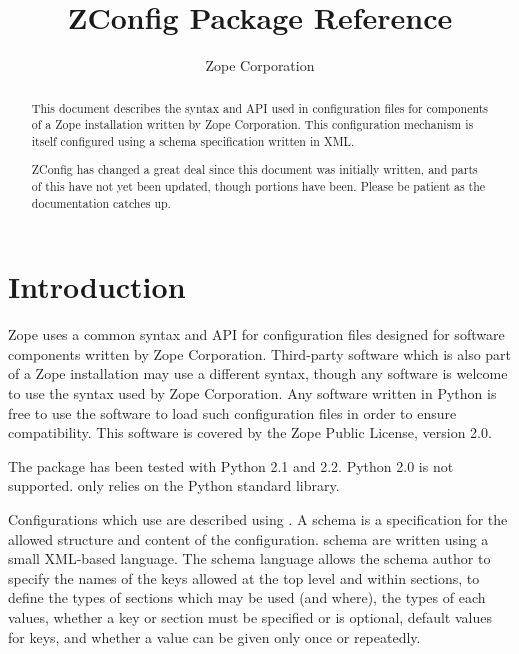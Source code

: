 \documentclass{howto}
\title{ZConfig Package Reference}
\author{Zope Corporation}
\begin{document}
\maketitle

\begin{abstract}
\noindent
This document describes the syntax and API used in configuration files
for components of a Zope installation written by Zope Corporation.  This
configuration mechanism is itself configured using a schema specification
written in XML.

\begin{notice}[warning]
  ZConfig has changed a great deal since this document was initially
  written, and parts of this have not yet been updated, though
  portions have been.  Please be patient as the documentation catches
  up.
\end{notice}
\end{abstract}

\tableofcontents


\section{Introduction \label{intro}}

Zope uses a common syntax and API for configuration files designed for
software components written by Zope Corporation.  Third-party software
which is also part of a Zope installation may use a different syntax,
though any software is welcome to use the syntax used by Zope
Corporation.  Any software written in Python is free to use the
 software to load such configuration files in order to
ensure compatibility.  This software is covered by the Zope Public
License, version 2.0.

The  package has been tested with Python 2.1 and 2.2.
Python 2.0 is not supported.
 only relies on the Python standard library.

Configurations which use  are described using
.  A schema is a specification for the allowed structure
and content of the configuration.   schema are written
using a small XML-based language.  The schema language allows the
schema author to specify the names of the keys allowed at the top
level and within sections, to define the types of sections which may
be used (and where), the types of each values, whether a key or
section must be specified or is optional, default values for keys, and
whether a value can be given only once or repeatedly.
\end{document}
